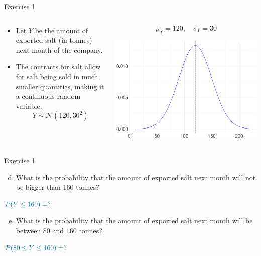 \documentclass[
  11pt,
  ignorenonframetext,
]{beamer}
\providecommand{\tightlist}{%
  \setlength{\itemsep}{0pt}\setlength{\parskip}{0pt}}
\begin{document}
\begin{frame}{Exercise 1}
\protect\hypertarget{exercise-1-2}{}
\begin{columns}[T]
\begin{column}{.7\textwidth}
\begin{itemize}
\tightlist
\item
  Let \(Y\) be the amount of exported salt (in tonnes) next month of the
  company.
\end{itemize}

\vspace{5mm}

\begin{itemize}
\tightlist
\item
  The contracts for salt allow for salt being sold in much smaller
  quantities, making it a continuous random variable. \[
  Y \sim \mathcal{N}(120,30^2)
  \]
\end{itemize}
\end{column}

\begin{column}{0.48\textwidth}
\small

\[
\mu_Y = 120; \quad \sigma_Y = 30
\]

\begin{center}\includegraphics[width=0.8\linewidth]{ECON1013_Tutorial2_files/figure-beamer/unnamed-chunk-4-1} \end{center}
\end{column}
\end{columns}
\end{frame}

\begin{frame}{Exercise 1}
\protect\hypertarget{exercise-1-3}{}
\begin{enumerate}
[(a)]
\setcounter{enumi}{3}
\tightlist
\item
  What is the probability that the amount of exported salt next month
  will not be bigger than \(160\) tonnes?
\end{enumerate}

\quad\quad \(\color{blue}{P(Y \leq 160) = ?}\)

\begin{enumerate}
[(a)]
\setcounter{enumi}{4}
\tightlist
\item
  What is the probability that the amount of exported salt next month
  will be between \(80\) and \(160\) tonnes?
\end{enumerate}

\quad\quad \(\color{blue}{P(80 \leq Y \leq 160) = ?}\)
\end{frame}
\end{document}
